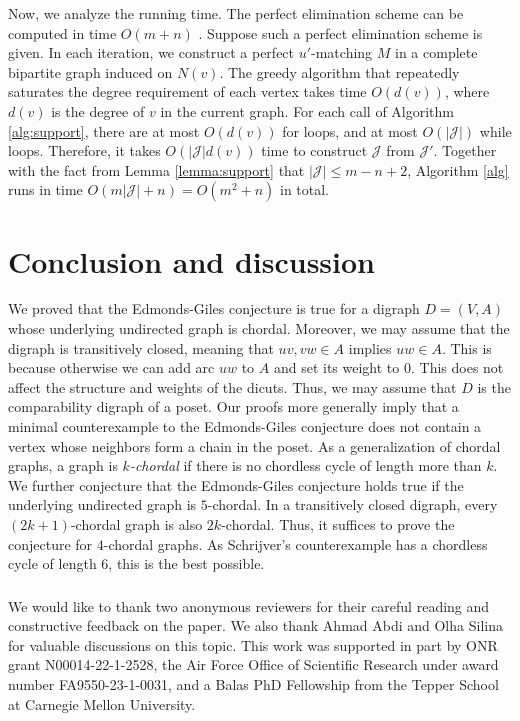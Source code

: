 \documentclass[runningheads]{llncs}
\begin{document}
Now, we analyze the running time. The perfect elimination scheme can be computed in time $O(m+n)$  \cite{roseluekertarjan1976}. Suppose such a perfect elimination scheme is given. In each iteration, we construct a perfect $u'$-matching $M$ in a complete bipartite graph induced on $N(v)$. The greedy algorithm that repeatedly saturates the degree requirement of each vertex takes time $O(d(v))$, where $d(v)$ is the degree of $v$ in the current graph. For each call of Algorithm \ref{alg:support}, there are at most $O(d(v))$ for loops, and at most $O(|\mathcal{J}|)$ while loops. Therefore, it takes  $O(|\mathcal{J}|d(v))$ time to construct $\mathcal{J}$ from $\mathcal{J}'$. Together with the fact from Lemma \ref{lemma:support} that $|\mathcal{J}|\leq m-n+2$, Algorithm \ref{alg} runs in time $O(m|\mathcal{J}|+n)=O(m^2+n)$ in total.


\section{Conclusion and discussion}
We proved that the Edmonds-Giles conjecture is true for a digraph $D=(V,A)$ whose underlying undirected graph is chordal. Moreover, we may assume that the digraph is transitively closed, meaning that $uv,vw\in A$ implies $uw\in A$. This is because otherwise we can add arc $uw$ to $A$ and set its weight to $0$. This does not affect the structure and weights of the dicuts. Thus, we may assume that $D$ is the comparability digraph of a poset. Our proofs more generally imply that a minimal counterexample to the Edmonds-Giles conjecture does not contain a vertex whose neighbors form a chain in the poset. As a generalization of chordal graphs, a graph is \textit{$k$-chordal} if there is no chordless cycle of length more than $k$. We further conjecture that the Edmonds-Giles conjecture holds true if the underlying undirected graph is $5$-chordal. In a transitively closed digraph, every $(2k+1)$-chordal graph is also $2k$-chordal. Thus, it suffices to prove the conjecture for $4$-chordal graphs.  As Schrijver's counterexample has a chordless cycle of length $6$, this is the best possible.


\begin{credits}
\subsubsection{\ackname} 
We would like to thank two anonymous reviewers for their careful reading and constructive feedback on the paper. We also thank Ahmad Abdi and Olha Silina for valuable discussions on this topic. This work was supported in part by ONR grant N00014-22-1-2528, the Air Force Office of
Scientific Research under award number FA9550-23-1-0031, and a Balas PhD Fellowship from the Tepper School at Carnegie Mellon University.
\end{credits}
\end{document}
